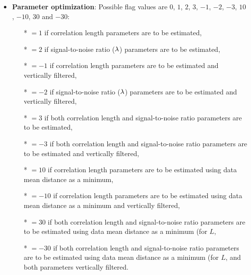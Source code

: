 \begin{itemize}
\item {\bf Parameter optimization}: Possible flag values are $0$, $1$, $2$, $3$, $-1$, $-2$, $-3$, $10$, $-10$, $30$ and $-30$:
              \begin{itemize}
                \item[*] $=1$ if correlation length parameters are to be estimated,
                \item[*] $=2$ if signal-to-noise ratio ($\lambda$) parameters are to be estimated,
                \item[*] $=-1$ if correlation length parameters are to be estimated and vertically filtered,
                \item[*] $=-2$ if signal-to-noise ratio ($\lambda$) parameters are to be estimated and vertically filtered,
                \item[*] $=3$ if both  correlation length and  signal-to-noise ratio parameters are to be estimated,
                \item[*] $=-3$ if both  correlation length and  signal-to-noise ratio parameters are to be estimated and vertically filtered,

                \item[*] $=10$ if correlation length parameters are to be estimated using data mean distance as a minimum,
                \item[*] $=-10$ if correlation length parameters are to be estimated using data mean distance as a minimum and vertically filtered,
                \item[*] $=30$ if both  correlation length and  signal-to-noise ratio parameters are to be estimated using data mean distance as a minimum (for $L$,
                \item[*] $=-30$ if both  correlation length and  signal-to-noise ratio parameters are to be estimated using data mean distance as a minimum (for $L$, and both parameters vertically filtered.
              \end{itemize}


\end{itemize}

